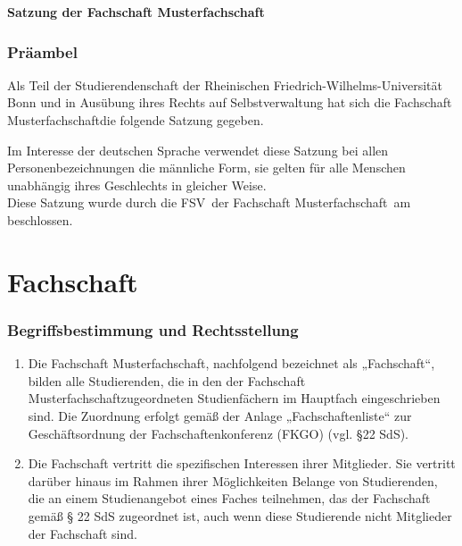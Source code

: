 \documentclass{article}
\newcommand{\fachschaft}{Musterfachschaft}
\newcommand{\beschlussgremium}{FSV} %
\newcommand{\beschlussdatum}{01.01.2020} %
\begin{document}
\noindent
\begin{center}
    \huge \textbf{Satzung der Fachschaft \fachschaft} \\
    \large {}
\end{center}

\section*{Präambel}
\noindent
Als Teil der Studierendenschaft der Rheinischen Friedrich-Wilhelms-Universität Bonn und in Ausübung ihres Rechts auf Selbstverwaltung hat sich die Fachschaft \fachschaft die
folgende Satzung gegeben.

Im Interesse der deutschen Sprache verwendet
diese Satzung bei allen Personenbezeichnungen die männliche Form, sie gelten für alle Menschen unabhängig ihres Geschlechts in gleicher Weise. \\[2mm]
Diese Satzung wurde durch die \beschlussgremium\ der Fachschaft \fachschaft\ am \ifthenelse{\boolean{publish}}{\beschlussdatum }{\textcolor{red}{DD.MM.YYYY}} beschlossen.

\part{Fachschaft}
\section{Begriffsbestimmung und Rechtsstellung}
\begin{enumerate}[(1)]
\item Die Fachschaft \fachschaft , nachfolgend bezeichnet als „Fachschaft“, bilden alle Studierenden, die in den der Fachschaft \fachschaft zugeordneten Studienfächern im Hauptfach eingeschrieben sind. Die Zuordnung erfolgt gemäß der Anlage „Fachschaftenliste“ zur Geschäftsordnung der Fachschaftenkonferenz (FKGO) (vgl. §22 SdS).
\item Die Fachschaft vertritt die spezifischen Interessen ihrer Mitglieder. Sie vertritt darüber hinaus im Rahmen ihrer Möglichkeiten Belange von Studierenden, die an einem Studienangebot eines Faches teilnehmen, das der Fachschaft gemäß § 22 SdS zugeordnet ist, auch wenn diese Studierende nicht Mitglieder der Fachschaft sind.
\end{enumerate}
\end{document}
